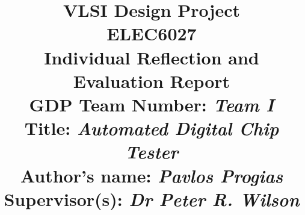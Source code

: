 \documentclass[journal]{IEEEtran}
\begin{document}
%
\title{VLSI Design Project \\%
ELEC6027 \\%
\medskip
\Large{Individual Reflection and Evaluation Report} \\%
\medskip
\large{GDP Team Number: \emph{Team I}}  \\%
\large{Title: \emph{Automated Digital Chip Tester}}  \\%
\smallskip
\large{Author's name: \emph{Pavlos Progias}}  \\%
\smallskip
\large{Supervisor(s): \emph{Dr Peter R. Wilson}}  \\%
}
%
%
\author{}%
% 
%
%

\end{document}

